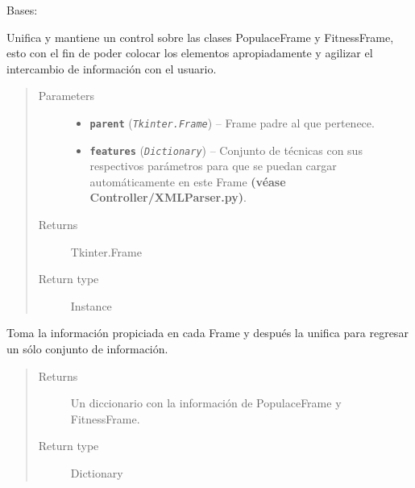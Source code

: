 \documentclass[letterpaper,10pt,english]{sphinxmanual}
\begin{document}
\begin{fulllineitems}
\label{View/Main/Population/PopulationFrame:View.Main.Population.PopulationFrame.PopulationFrame}
Bases: 

Unifica y mantiene un control sobre las clases PopulaceFrame y 
FitnessFrame, esto con el fin de poder colocar los elementos apropiadamente y 
agilizar el intercambio de información con el usuario.
\begin{quote}\begin{description}
\item[{Parameters}] \leavevmode\begin{itemize}
\item {} 
\textbf{\texttt{parent}} (\emph{\texttt{Tkinter.Frame}}) -- Frame padre al que pertenece.

\item {} 
\textbf{\texttt{features}} (\emph{\texttt{Dictionary}}) -- Conjunto de técnicas con sus respectivos parámetros para que
se puedan cargar automáticamente en este Frame \textbf{(véase
Controller/XMLParser.py)}.

\end{itemize}

\item[{Returns}] \leavevmode
Tkinter.Frame

\item[{Return type}] \leavevmode
Instance

\end{description}\end{quote}

\begin{fulllineitems}
\label{View/Main/Population/PopulationFrame:View.Main.Population.PopulationFrame.PopulationFrame.get_information}
Toma la información propiciada en cada Frame y después
la unifica para regresar un sólo conjunto de información.
\begin{quote}\begin{description}
\item[{Returns}] \leavevmode
Un diccionario con la información de PopulaceFrame y FitnessFrame.

\item[{Return type}] \leavevmode
Dictionary

\end{description}\end{quote}


\end{fulllineitems}
\end{fulllineitems}
\end{document}
